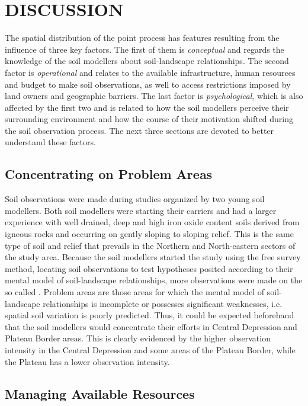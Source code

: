 \section{DISCUSSION}

The spatial distribution of the point process has features resulting from the influence of three key factors. 
The first of them is \textit{conceptual} and regards the knowledge of the soil modellers about soil-landscape 
relationships. The second factor is \textit{operational} and relates to the available infrastructure, human 
resources and budget to make soil observations, as well to access restrictions imposed by land owners and 
geographic barriers. The last factor is \textit{psychological}, which is also affected by the first two and is 
related to how the soil modellers perceive their surrounding environment and how the course of their 
motivation shifted during the soil observation process. The next three sections are devoted to better 
understand these factors.

\subsection{Concentrating on Problem Areas}
\label{subsec:chap06-conceptual}

Soil observations were made during studies organized by two young soil modellers. Both soil modellers were 
starting their carriers and had a larger experience with well drained, deep and high iron oxide content soils 
derived from igneous rocks and occurring on gently sloping to sloping relief. This is the same type of soil and
relief that prevails in the Northern and North-eastern sectors of the study area. Because the soil 
modellers started the study using the free survey method, locating soil observations to test hypotheses 
posited according to their mental model of soil-landscape relationships, more observations were made on the so 
called  \cite{Rossiter2000}. Problem areas are those areas for which the mental model of 
soil-landscape relationships is incomplete or possesses significant weaknesses, i.e. spatial soil variation is 
poorly predicted. Thus, it could be expected beforehand that the soil modellers would concentrate their 
efforts in Central Depression and Plateau Border areas. This is clearly evidenced by the higher observation 
intensity in the Central Depression and some areas of the Plateau Border, while the Plateau has a lower 
observation intensity.

\subsection{Managing Available Resources}


